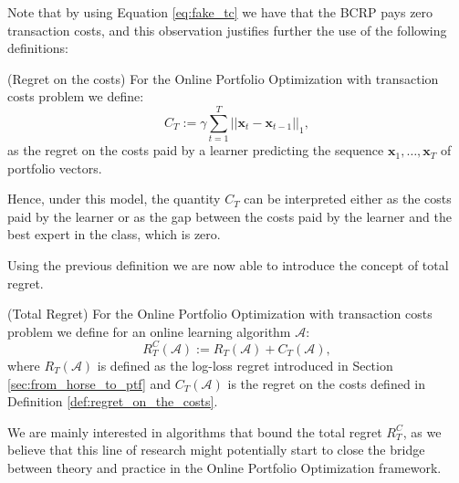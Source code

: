 Note that by using Equation \eqref{eq:fake_tc} we have that the BCRP pays zero transaction costs, and this observation justifies further the use of the following definitions:

\begin{definition}(Regret on the costs)\label{def:regret_on_the_costs}
For the Online Portfolio Optimization with transaction costs problem we define:
\begin{equation}
C_T:=\gamma\sum\limits_{t=1}^T||\mathbf x_t-\mathbf x_{t-1}||_1,
\end{equation}
as the regret on the costs paid by a learner predicting the sequence $\mathbf x_1,\ldots,\mathbf x_T$ of portfolio vectors.
\end{definition}

Hence, under this model, the quantity $C_T$ can be interpreted either as the costs paid by the learner or as the gap between the costs paid by the learner and the best expert in the class, which is zero.

Using the previous definition we are now able to introduce the concept of total regret.

\begin{definition}(Total Regret)\label{def:totoal_regret}
For the Online Portfolio Optimization with transaction costs problem we define for an online learning algorithm $\mathcal A$: 
\begin{equation}
R_T^C(\mathcal A):=R_T(\mathcal A)+C_T(\mathcal A),
\end{equation}
where $R_T(\mathcal A)$ is defined as the log-loss regret introduced in Section \ref{sec:from_horse_to_ptf} and $C_T(\mathcal A)$ is the regret on the costs defined in Definition \ref{def:regret_on_the_costs}.
\end{definition}

We are mainly interested in algorithms that bound the total regret $R_T^C$, as we believe that this line of research might potentially start to close the bridge between theory and practice in the Online Portfolio Optimization framework.


